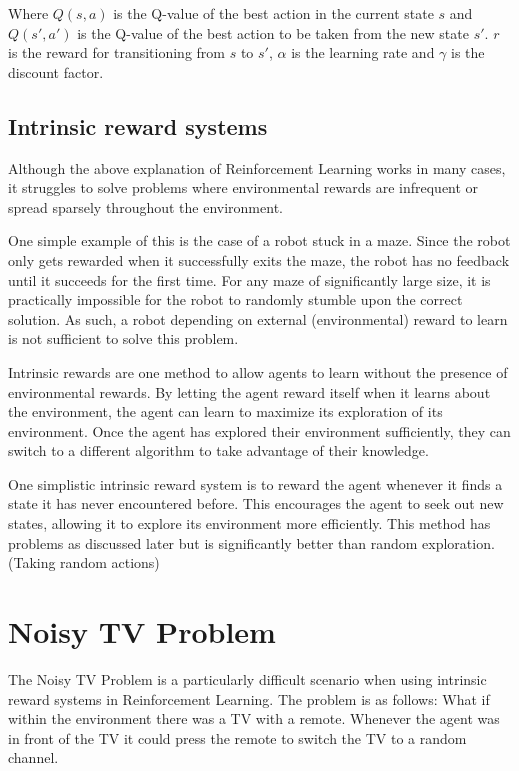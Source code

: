 \documentclass[12pt]{thesis}
\begin{document}
Where $Q(s,a)$ is the Q-value of the best action in the current state $s$ and $Q(s',a')$ is the Q-value of the best action to be taken from the new state $s'$. $r$ is the reward for transitioning from $s$ to $s'$, $\alpha$ is the learning rate and $\gamma$ is the discount factor.

\subsection{Intrinsic reward systems}
Although the above explanation of Reinforcement Learning works in many cases, it struggles to solve problems where environmental rewards are infrequent or spread sparsely throughout the environment. \cite{DBLP:journals/corr/abs-1908-06976}

One simple example of this is the case of a robot stuck in a maze. Since the robot only gets rewarded when it successfully exits the maze, the robot has no feedback until it succeeds for the first time. For any maze of significantly large size, it is practically impossible for the robot to randomly stumble upon the correct solution. As such, a robot depending on external (environmental) reward to learn is not sufficient to solve this problem.

Intrinsic rewards are one method to allow agents to learn without the presence of environmental rewards. By letting the agent reward itself when it learns about the environment, the agent can learn to maximize its exploration of its environment. Once the agent has explored their environment sufficiently, they can switch to a different algorithm to take advantage of their knowledge. \cite{Rein:VIME}

One simplistic intrinsic reward system is to reward the agent whenever it finds a state it has never encountered before.  \cite{DBLP:journals/corr/TangHFSCDSTA16} This encourages the agent to seek out new states, allowing it to explore its environment more efficiently. This method has problems as discussed later but is significantly better than random exploration. (Taking random actions)

\section{Noisy TV Problem}
The Noisy TV Problem is a particularly difficult scenario when using intrinsic reward systems in Reinforcement Learning. \cite{DBLP:journals/corr/abs-2008-04388} The problem is as follows: What if within the environment there was a TV with a remote. Whenever the agent was in front of the TV it could press the remote to switch the TV to a random channel.
\end{document}
